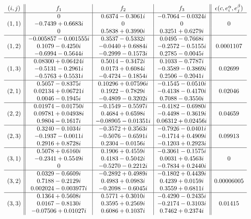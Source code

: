 \begin{widetext}
\begin{table}
\caption{Optimal bases for $\alpha=1,\beta=3$}\label{tbl:second}
\footnotesize
\[
\begin{array}{c||c|c|c||c}
(i,j) & f_1 & f_2 & f_3 & \epsilon(c,e^\alpha_i,e^\beta_j) \\
\hline
 & 0 & 0.6374-0.3061 i & -0.7064-0.0324 i \\
(1,1) &  -0.7439+0.6683 i & 0 & 0 & 0 \\
& 0 & 0.5838+0.3990 i & 0.3251+0.6279 i \\
 \hline
 &-0.005857-0.001555 i & 0.3537-0.5332 i & 0.0495-0.7668 i \\
(1,2) &  0.1079-0.4250 i & -0.0440+0.6884 i & -0.2572-0.5155 i & 0.0001107 \\
 &-0.6994-0.5644 i & -0.2999-0.1573 i & 0.2785-0.0045 i \\
 \hline
 &0.08300+0.06424 i & 0.5014-0.3472 i & 0.1033-0.7787 i \\
 (1,3) & -0.5131-0.2961 i & 0.0173+0.6084 i & -0.3589-0.3869 i & 0.02699\\
 &-0.5763+0.5531 i & -0.4724-0.1854 i & 0.2506-0.2041 i \\
\hline
 &0.5057-0.8375 i & 0.10296+0.07596 i & -0.1545-0.0510 i \\
(2,1) & 0.02134+0.06721 i & 0.1922-0.7829 i & -0.4138-0.4170 i & 0.02046 \\
 &0.0046-0.1945 i & -0.4809-0.3202 i & 0.7088-0.3550 i \\
\hline
& 0.01974-0.01750 i & -0.1549-0.5597 i & -0.4182-0.6980 i \\
(2,2) &  0.09781+0.04938 i & 0.4684+0.6598 i & -0.4498-0.3619 i & 0.04659 \\
 &0.9804-0.1617 i & -0.08905-0.01351 i & 0.06312+0.02456 i \\
\hline
 &0.3240-0.1034 i & -0.3572+0.3563 i & -0.7926-0.0401 i \\
(2,3) &  -0.1937-0.0011 i & -0.5076-0.6591 i & -0.1714+0.4909 i & 0.09913 \\
 &0.2916+0.8728 i & 0.2304-0.0156 i & -0.1203+0.2923 i \\
\hline
 &0.5078+0.6160 i & 0.1906+0.4559 i & -0.3061-0.1575 i \\
(3,1) &  -0.2341+0.5549 i & 0.4183-0.5042 i & 0.0031+0.4563 i & 0 \\
& 0 & -0.5270-0.2212 i & -0.7834+0.2440 i \\
\hline
 &0.0329-0.6609 i & -0.2892+0.4989 i & -0.1802+0.4439 i \\
(3,2) & 0.7188-0.2129 i & 0.4983+0.0983 i & 0.4239+0.0159 i & 0.00006005 \\
 &0.002024-0.003977 i & -0.2098-0.6045 i & 0.3559+0.6811 i \\
\hline
 &0.1364+0.5608 i & 0.5771+0.3010 i & -0.4290-0.2435 i \\
(3,3) & 0.0167-0.8130 i & 0.3595+0.2569 i & -0.2174-0.3103 i & 0.01415 \\
 &-0.07506+0.01027 i & 0.6086+0.1037 i & 0.7462+0.2374 i \\
\end{array}
\]
\end{table}


\end{widetext}
